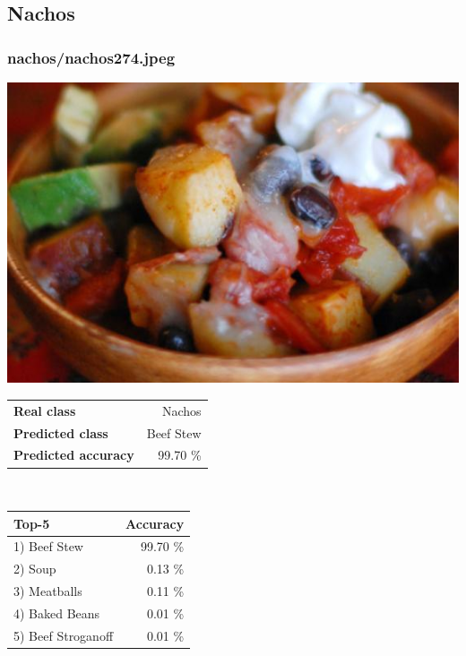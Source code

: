 \subsection{Nachos}
    
\subsubsection{nachos/nachos274.jpeg}

\begin{minipage}[t]{0.4\textwidth}
	\vspace{0pt}
	\includegraphics[width=\linewidth]{images/evaluation-images/nachos/nachos274.jpeg}
\end{minipage}
\hfill
\begin{minipage}[t]{0.5\textwidth}
	\vspace{0pt}\raggedright
	\begin{tabularx}{\textwidth}{X r}
		\small \textbf{Real class} & \small Nachos\\
		\small \textbf{Predicted class} & \small Beef Stew\\
		\small \textbf{Predicted accuracy} & \small 99.70 \%
    \end{tabularx}\\
    
    \vspace{6pt}
	\begin{tabularx}{\textwidth}{X r}
        \small \textbf{Top-5} & \small \textbf{Accuracy} \\
        \hline
		\small 1) Beef Stew & \small 99.70 \%\\\small 2) Soup & \small 0.13 \%\\\small 3) Meatballs & \small 0.11 \%\\\small 4) Baked Beans & \small 0.01 \%\\\small 5) Beef Stroganoff & \small 0.01 \%
    \end{tabularx}
\end{minipage}
    

